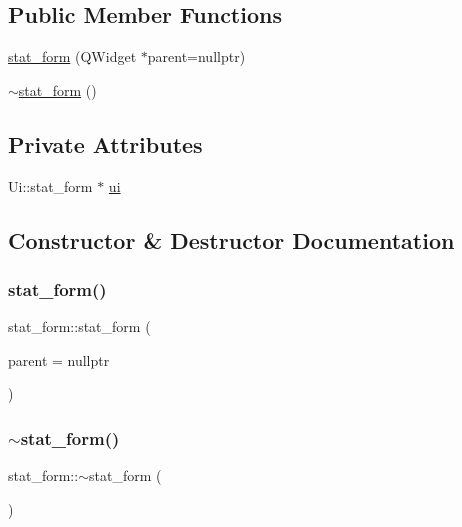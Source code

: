\subsection*{Public Member Functions}
\begin{DoxyCompactItemize}
\item 
\mbox{\hyperlink{classstat__form_af282c982608f55b942190fd743d858bc}{stat\+\_\+form}} (Q\+Widget $\ast$parent=nullptr)
\item 
\mbox{\hyperlink{classstat__form_a7a0e7f191915a1fcf7e2043bc39448b0}{$\sim$stat\+\_\+form}} ()
\end{DoxyCompactItemize}
\subsection*{Private Attributes}
\begin{DoxyCompactItemize}
\item 
Ui\+::stat\+\_\+form $\ast$ \mbox{\hyperlink{classstat__form_ad5b81bf00866310ef140276effa0f165}{ui}}
\end{DoxyCompactItemize}


\subsection{Constructor \& Destructor Documentation}
\mbox{\label{classstat__form_af282c982608f55b942190fd743d858bc}} 
\subsubsection{\texorpdfstring{stat\_form()}{stat\_form()}}
{\footnotesize\ttfamily stat\+\_\+form\+::stat\+\_\+form (\begin{DoxyParamCaption}\item[{Q\+Widget $\ast$}]{parent = {\ttfamily nullptr} }\end{DoxyParamCaption})\hspace{0.3cm}{\ttfamily [explicit]}}

\mbox{\label{classstat__form_a7a0e7f191915a1fcf7e2043bc39448b0}} 
\subsubsection{\texorpdfstring{$\sim$stat\_form()}{~stat\_form()}}
{\footnotesize\ttfamily stat\+\_\+form\+::$\sim$stat\+\_\+form (\begin{DoxyParamCaption}{ }\end{DoxyParamCaption})}



